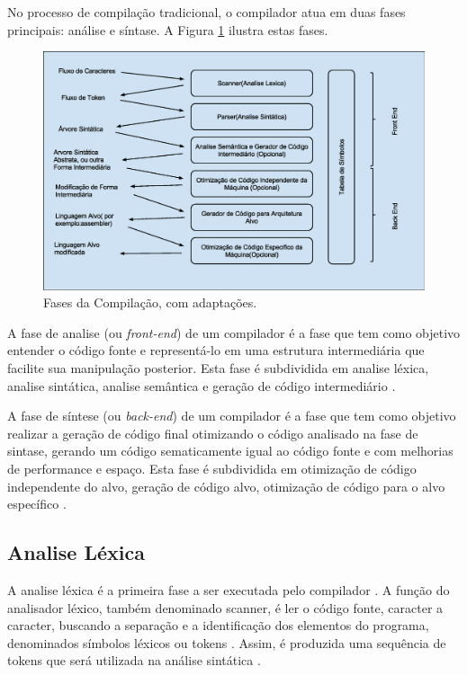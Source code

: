 No processo de compilação tradicional, o compilador atua em duas fases 
principais: análise e síntase\cite{ref12}\cite{ref13}. A Figura \ref{fig01}
 ilustra estas fases. 

\begin{figure}[h]
    \centering
    \label{fig01}
        \includegraphics[keepaspectratio=true,scale=0.5]{figuras/fases_da_compilacao.eps}
    \caption{Fases da Compilação, com adaptações.}
\end{figure}

A fase de analise (ou \textit{front-end}) de um compilador é a fase que 
tem como objetivo entender o código fonte e  representá-lo em uma 
estrutura intermediária que facilite sua manipulação posterior. 
Esta fase é subdividida em analise léxica, analise sintática, 
analise semântica e geração de código intermediário \cite{ref14}.

A fase de síntese (ou \textit{back-end}) de um compilador é a fase que tem 
como objetivo realizar a geração de código final otimizando o código 
analisado na fase de sintase, gerando um código sematicamente igual ao 
código fonte e com melhorias de performance e espaço. Esta fase é 
subdividida em otimização de código independente do alvo, geração de 
código alvo, otimização de código  para o alvo específico \cite{ref14}.


\subsection{Analise Léxica}
    
A analise léxica é a primeira fase a ser executada pelo compilador \cite{ref15}. 
A função do analisador léxico, também denominado scanner, é ler o código fonte, 
caracter a caracter, buscando a separação e  a identificação dos elementos do 
programa, denominados símbolos léxicos ou tokens \cite{ref16}. Assim, é 
produzida uma sequência de tokens que será utilizada na análise sintática \cite{ref17}. 

